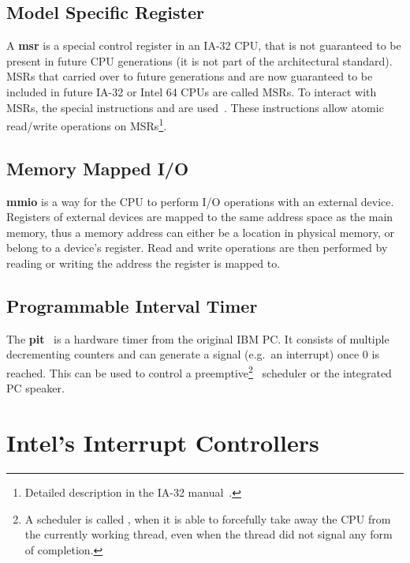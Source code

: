 \subsection{Model Specific Register}
\label{subsec:msr}

A \textbf{\gls{msr}} is a special control register in an IA-32 CPU, that is not guaranteed to be present in future CPU generations (it is not part of the architectural standard).
MSRs that carried over to future generations and are now guaranteed to be included in future IA-32 or Intel 64 CPUs are called  MSRs.
To interact with MSRs, the special instructions  and  are used~\autocite{x86isa}.
These instructions allow atomic read/write operations on MSRs\footnote{
  Detailed description in the IA-32 manual~\autocite[sec.~4.2]{ia32}.}.

\subsection{Memory Mapped I/O}
\label{subsec:mmio}

\textbf{\gls{mmio}} is a way for the CPU to perform I/O operations with an external device.
Registers of external devices are mapped to the same address space as the main memory, thus a memory address can either be a location in physical memory, or belong to a device's register.
Read and write operations are then performed by reading or writing the address the register is mapped to.

\subsection{Programmable Interval Timer}
\label{subsec:pit}

The \textbf{\gls{pit}}~\autocite{pit} is a hardware timer from the original IBM PC\@.
It consists of multiple decrementing counters and can generate a signal (e.g.\ an interrupt) once 0 is reached.
This can be used to control a preemptive\footnote{
  A scheduler is called , when it is able to forcefully take away the CPU from the currently working thread, even when the thread did not signal any form of completion.}
\ scheduler or the integrated PC speaker.

\section{Intel's Interrupt Controllers}
\label{sec:intelcontrollers}

